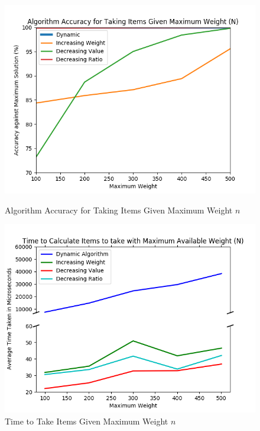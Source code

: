 \documentclass[10pt, letterpaper]{article}
\begin{document}
\begin{figure}[!tbp]
	\centering
	\begin{minipage}[t]{0.49\textwidth}
		\includegraphics[width=\textwidth]{python/accuracyGraph.png}
		\caption{Algorithm Accuracy for Taking Items Given Maximum Weight $n$}
		\label{fig:accuracy-graph}
	\end{minipage}
	\hfill
	\begin{minipage}[t]{0.49\textwidth}
		\includegraphics[width=\textwidth]{python/timeGraph.png}
		\caption{Time to Take Items Given Maximum Weight $n$}
		\label{fig:time-graph}
	\end{minipage}
\end{figure}
\end{document}
